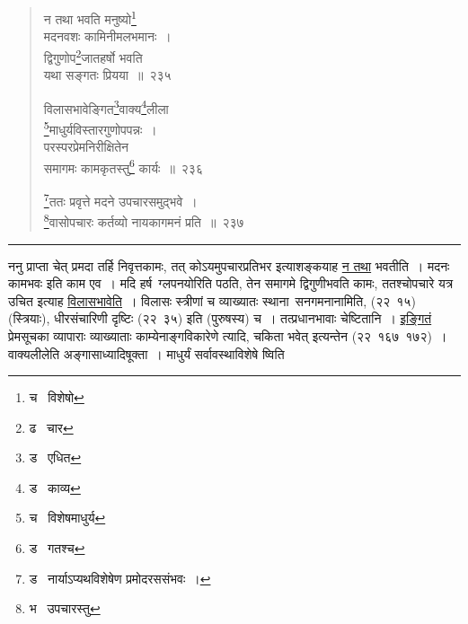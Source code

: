 \documentclass[11pt, openany]{book}
\begin{document}
\newpage

\begin{quote}
{\na न तथा भवति मनुष्यो\renewcommand{\thefootnote}{1}\footnote{च \textendash\  विशेषो}\\
मदनवशः कामिनीमलभमानः~।\\
द्विगुणोप\renewcommand{\thefootnote}{2}\footnote{ढ \textendash\  चार}जातहर्षो भवति\\
यथा सङ्गतः प्रियया~॥~२३५

विलासभावेङ्गित\renewcommand{\thefootnote}{3}\footnote{ड \textendash\  एधित}वाक्य\renewcommand{\thefootnote}{4}\footnote{ड \textendash\  काव्य}लीला\textendash \\
\renewcommand{\thefootnote}{5}\footnote{च \textendash\  विशेषमाधुर्य}माधुर्यविस्तारगुणोपपन्नः~।\\
परस्परप्रेमनिरीक्षितेन\\
समागमः कामकृतस्तु\renewcommand{\thefootnote}{6}\footnote{ड \textendash\  गतश्च} कार्यः~॥~२३६

\renewcommand{\thefootnote}{7}\footnote{ड \textendash\  नार्याऽप्यथविशेषेण प्रमोदरससंभवः~।}ततः प्रवृत्ते मदने उपचारसमुद्भवे~।\\
\renewcommand{\thefootnote}{8}\footnote{भ \textendash\  उपचारस्तु}वासोपचारः कर्तव्यो नायकागमनं प्रति~॥~२३७}
\end{quote}

\hrule

\vspace{2mm}
ननु प्राप्ता चेत् प्रमदा तर्हि निवृत्तकामः, तत् कोऽयमुपचारप्रतिभर इत्याशङ्कयाह \underline{न तथा} भवतीति~। मदनः कामभवः इति काम एव~। मदि हर्ष\textendash\ ग्लपनयोरिति पठति, तेन समागमे द्विगुणीभवति कामः, ततश्चोपचारे यत्र उचित इत्याह \underline{विलासभावेति}~। विलासः स्त्रीणां च व्याख्यातः {\qt स्थाना\textendash\ सनगमनाना}मिति, (२२\textendash\ १५) (स्त्रियाः), {\qt धीरसंचारिणी दृष्टिः (२२\textendash\ ३५) इति (पुरुषस्य) च~। तत्प्रधानभावाः चेष्टितानि~। \underline{इङ्गितं} प्रेमसूचका व्यापाराः व्याख्याताः} काम्येनाङ्गविकारेणे त्यादि, {\qt चकिता भवेत्} इत्यन्तेन (२२\textendash\ १६७\textendash\ १७२)~।\\

वाक्यलीलेति अङ्गासाध्यादिषूक्ता~। माधुर्यं {\qt सर्वावस्थाविशेषे} ष्विति

\newpage
\end{document}
